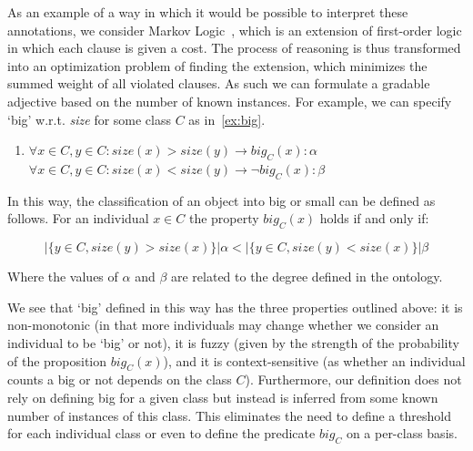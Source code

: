 \documentclass[11pt]{article}
\begin{document}
As an example of a way in which it would be possible to interpret these 
annotations, we consider Markov Logic~\cite{richardson2006markov}, which is an 
extension of first-order logic in which each clause is given a cost. The process 
of reasoning is thus transformed into an optimization problem of finding the 
extension, which minimizes the summed weight of all violated clauses. As such we
can formulate a gradable adjective based on the number of known instances. 
For example, we can specify `big' w.r.t. \emph{size} for some class $C$ as in~\ref{ex:big}.
%
\begin{enumerate}
\item $\forall x \in C, y \in C : size(x) > size(y) \rightarrow big_C(x) : \alpha$ \\
$\forall x \in C, y \in C : size(x) < size(y) \rightarrow \neg big_C(x) : \beta$
\label{ex:big}
\end{enumerate}
%
In this way, the classification of an object into big or small can be defined as follows.
For an individual $x \in C$ the property $big_C(x)$ holds if and only if: 

\vspace{-1.0em}
$$|\{y \in C, size(y) > size(x)\}| \alpha < |\{y \in C, size(y) < size(x)\}| \beta$$
\vspace{-1.5em}

Where the values of $\alpha$ and $\beta$ are related to the degree defined
in the ontology.

We see that `big' defined in this way has the three properties outlined above: 
it is non-monotonic (in that more individuals may change whether we consider an individual 
to be `big' or not), it is fuzzy (given by the strength of the probability of the proposition $big_C(x)$), 
and it is context-sensitive (as whether an individual counts a big or not depends on the class $C$). 
Furthermore, our definition does not rely on defining big for a given class but instead is inferred
from some known number of instances of this class. This eliminates the need to
define a threshold for each individual class or even to define the predicate $big_C$ on a per-class
basis.
\end{document}
